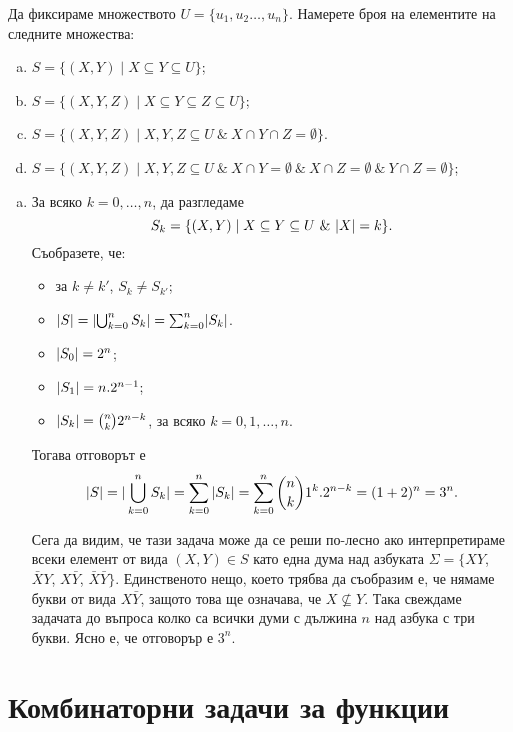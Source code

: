 \begin{problem}
  Да фиксираме множеството $U = \{u_1,u_2\dots,u_n\}$.
  Намерете броя на елементите на следните множества:
  \begin{enumerate}[a)]
  \item 
    $S = \{(X,Y) \mid X \subseteq Y \subseteq U\}$;
  \item
    $S = \{(X,Y,Z) \mid X \subseteq Y \subseteq Z \subseteq U\}$;
  \item
    $S = \{(X,Y,Z) \mid X,Y,Z \subseteq U\ \&\ X \cap Y \cap Z = \emptyset\}$.
  \item
    $S = \{(X,Y,Z) \mid X,Y,Z \subseteq U\ \&\ X\cap Y = \emptyset\ \&\ X \cap Z = \emptyset\ \&\ Y \cap Z = \emptyset\}$;
  \end{enumerate}
\end{problem}
\begin{hint}
  \begin{enumerate}[a)]
  \item 
    За всяко $k = 0,\dots,n$, да разгледаме
    \[S_k = \{(X,Y) \mid X \subseteq Y \subseteq U\ \&\ \lvert{X}\rvert = k\}.\]
    Съобразете, че:
    \begin{itemize}
    \item 
      за $k \neq k'$, $S_k \neq S_{k'}$;
    \item
      $\lvert{S}\rvert = \lvert{\bigcup^n_{k=0} S_k}\rvert = \sum^n_{k=0}\lvert{S_k}\rvert$.
    \item
      $\lvert{S_0}\rvert = 2^n$;
    \item
      $\lvert{S_1}\rvert = n.2^{n-1}$;
    \item
      $\lvert{S_k}\rvert = \binom{n}{k}2^{n-k}$, за всяко $k = 0,1,\dots,n$.
    \end{itemize}
    Тогава отговорът е
    \[\lvert{S}\rvert = |\bigcup^n_{k=0} S_k| = \sum^n_{k=0} |S_k| = \sum^n_{k=0} \binom{n}{k}1^k.2^{n-k} = (1+2)^n = 3^n.\]
    
    Сега да видим, че тази задача може да се реши по-лесно ако интерпретираме всеки елемент от вида $(X,Y) \in S$
    като една дума над азбуката $\Sigma = \{XY$, $\bar{X}Y$, $X\bar{Y}$, $\bar{X}\bar{Y}\}$.
    Единственото нещо, което трябва да съобразим е, че нямаме букви от вида $X\bar{Y}$, защото това ще означава, че 
    $X \not\subseteq Y$. Така свеждаме задачата до въпроса колко са всички думи с дължина $n$ над азбука с три букви.
    Ясно е, че отговорър е $3^n$.
  \end{enumerate}
\end{hint}


\section{Комбинаторни задачи за функции}

